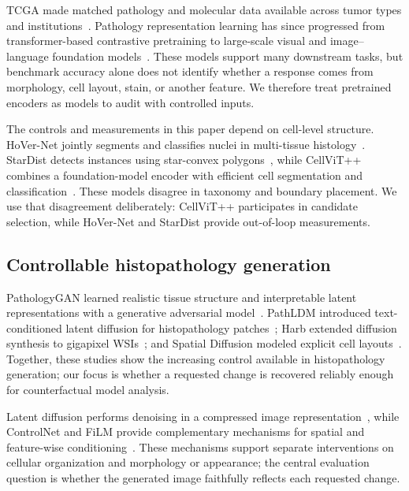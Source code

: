 TCGA made matched pathology and molecular data available across tumor types and institutions~\cite{tcga2013pancancer}. Pathology representation learning has since progressed from transformer-based contrastive pretraining to large-scale visual and image--language foundation models~\cite{wang2022ctranspath,chen2024uni,vorontsov2024virchow,lu2024conch,xu2024gigapath}. These models support many downstream tasks, but benchmark accuracy alone does not identify whether a response comes from morphology, cell layout, stain, or another feature. We therefore treat pretrained encoders as models to audit with controlled inputs.

The controls and measurements in this paper depend on cell-level structure. HoVer-Net jointly segments and classifies nuclei in multi-tissue histology~\cite{graham2019hovernet}. StarDist detects instances using star-convex polygons~\cite{schmidt2018stardist}, while CellViT++ combines a foundation-model encoder with efficient cell segmentation and classification~\cite{horst2026cellvitpp}. These models disagree in taxonomy and boundary placement. We use that disagreement deliberately: CellViT++ participates in candidate selection, while HoVer-Net and StarDist provide out-of-loop measurements.

\subsection{Controllable histopathology generation}

PathologyGAN learned realistic tissue structure and interpretable latent representations with a generative adversarial model~\cite{quiros2021pathologygan}. PathLDM introduced text-conditioned latent diffusion for histopathology patches~\cite{yellapragada2024pathldm}; Harb \etal{} extended diffusion synthesis to gigapixel WSIs~\cite{harb2024gigapixel}; and Spatial Diffusion modeled explicit cell layouts~\cite{li2024spatialdiffusion}. Together, these studies show the increasing control available in histopathology generation; our focus is whether a requested change is recovered reliably enough for counterfactual model analysis.

Latent diffusion performs denoising in a compressed image representation~\cite{rombach2022latent}, while ControlNet and FiLM provide complementary mechanisms for spatial and feature-wise conditioning~\cite{zhang2023controlnet,perez2018film}. These mechanisms support separate interventions on cellular organization and morphology or appearance; the central evaluation question is whether the generated image faithfully reflects each requested change.

